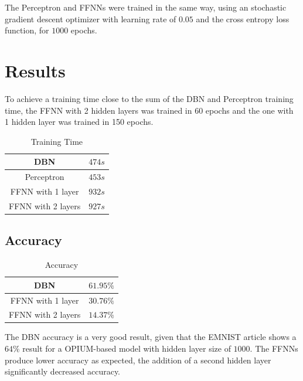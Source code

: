 \documentclass[a4paper, 11pt]{article}
\begin{document}
		The Perceptron and FFNNs were trained in the same way, using an stochastic gradient descent optimizer with learning rate of $ 0.05 $ and the cross entropy loss function, for $ 1000 $ epochs. 
				
		
	\section{Results}
		To achieve a training time close to the sum of the DBN and Perceptron training time, the FFNN with 2 hidden layers was trained in 60 epochs and the one with 1 hidden layer was trained in 150 epochs.
		
			\begin{table}[H]
				\centering
				\begin{tabular}{c|c}
					DBN 					&  $ 474 s $    \\ \hline
					Perceptron 				&  $ 453 s $      \\ \hline
					FFNN with 1 layer		&  $ 932 s $     \\ \hline
					FFNN with 2 layers		&  $ 927 s $    \\
				\end{tabular}
				\caption{Training Time}
				\label{tab:Ttime}
			\end{table}
			
		\subsection{Accuracy}
			\begin{table}[H]
				\centering
				\begin{tabular}{c|c}
					DBN 					&  $ 61.95\% $    \\ \hline
					FFNN with 1 layer		&  $ 30.76\% $     \\ \hline
					FFNN with 2 layers		&  $ 14.37\% $    \\
				\end{tabular}
				\caption{Accuracy}
				\label{tab:acc}
			\end{table}
			The DBN accuracy is a very good result, given that the EMNIST article \cite{emnist} shows a $ 64\% $ result for a OPIUM-based model with hidden layer size of $ 1000 $.
			The FFNNs produce lower accuracy as expected, the addition of a second hidden layer significantly decreased accuracy.
			
	
\end{document}
